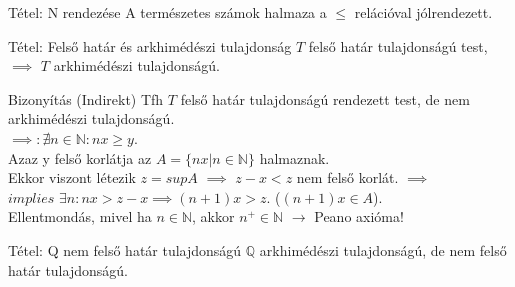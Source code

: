 \documentclass{beamer}
\begin{document}
\begin{frame}

\begin{block}{Tétel: N rendezése}
A természetes számok halmaza a $\leq$ relációval jólrendezett.
\end{block}

\end{frame}

\begin{frame}

\begin{block}{Tétel: Felső határ és arkhimédészi tulajdonság}
$T$ felső határ tulajdonságú test, $\implies$ $T$ arkhimédészi tulajdonságú.
\end{block}

\begin{block}{Bizonyítás (Indirekt)}
Tfh $T$ felső határ tulajdonságú rendezett test, de nem arkhimédészi tulajdonságú.\\
$\implies : {\nexists}n \in \mathbb{N} : nx \geq y$.\\
Azaz y felső korlátja az $A = \{ nx | n \in \mathbb{N} \}$ halmaznak.\\
Ekkor viszont létezik $z = sup A$ $\implies$ $z - x < z$ nem felső korlát. $\implies$\\
$implies$ ${\exists}n : nx > z - x \implies (n + 1)x > z$. ($(n + 1)x \in A$).\\
Ellentmondás, mivel ha $n \in \mathbb{N}$, akkor $n^+ \in \mathbb{N}$ $\rightarrow$ Peano axióma!
\end{block}

\end{frame}

\begin{frame}

\begin{block}{Tétel: Q nem felső határ tulajdonságú}
$\mathbb{Q}$ arkhimédészi tulajdonságú, de nem felső határ tulajdonságú.
\end{block}

\end{frame}
\end{document}
